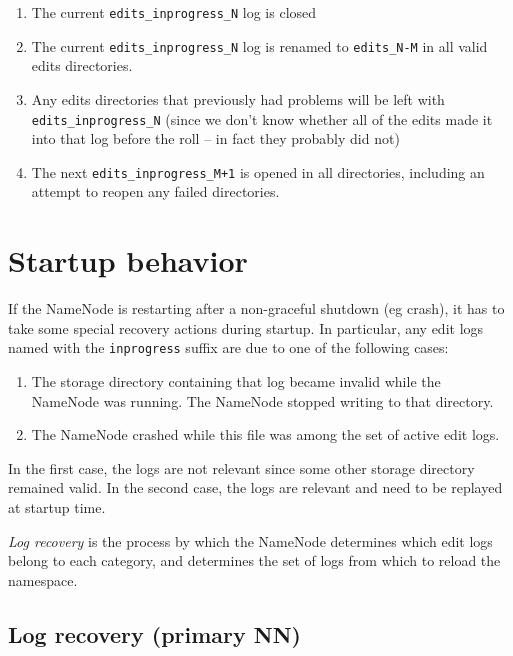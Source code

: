 \documentclass{article}
\begin{document}
\begin{enumerate}
\item The current {\tt edits\_inprogress\_N} log is closed
\item The current {\tt edits\_inprogress\_N} log is renamed to {\tt edits\_N-M} in all valid edits directories.
\item Any edits directories that previously had problems will be left with {\tt edits\_inprogress\_N} (since we don't know whether all of the edits made it into that log before the roll -- in fact they probably did not)
\item The next {\tt edits\_inprogress\_M+1} is opened in all directories, including an attempt to reopen any failed directories.
\end{enumerate}

\section{Startup behavior}

If the NameNode is restarting after a non-graceful shutdown (eg crash), it has to take some special recovery actions
during startup. In particular, any edit logs named with the {\tt inprogress} suffix are due to one of the
following cases:
\begin{enumerate}
\item The storage directory containing that log became invalid while the NameNode was running. The NameNode stopped writing to that directory.
\item The NameNode crashed while this file was among the set of active edit logs.
\end{enumerate}

In the first case, the logs are not relevant since some other storage directory remained valid. In the second case,
the logs are relevant and need to be replayed at startup time.

{\em Log recovery} is the process by which the NameNode determines which edit logs belong to each category, and
determines the set of logs from which to reload the namespace.

\subsection{Log recovery (primary NN)}\label{logrecovery}
\end{document}
